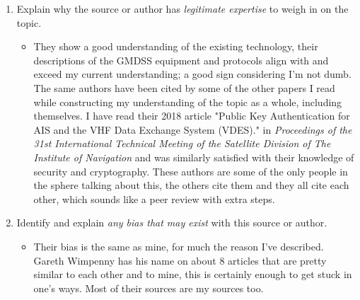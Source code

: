 \documentclass[12pt]{texMemo} %
\begin{document}
\begin{enumerate}
\begin{enumerate}
\begin{itemize}
        \end{itemize}
    \item Explain why the source or author has \emph{legitimate expertise} to weigh in on the topic.
        \begin{itemize}
            \item They show a good understanding of the existing technology, their descriptions of the GMDSS equipment and protocols align with and exceed my current understanding; a good sign considering I'm not dumb. The same authors have been cited by some of the other papers I read while constructing my understanding of the topic as a whole, including themselves. I have read their 2018 article "Public Key Authentication for AIS and the VHF Data Exchange System (VDES)." in \textit{Proceedings of the 31st International Technical Meeting of the Satellite Division of The Institute of Navigation} and was similarly satisfied with their knowledge of security and cryptography. These authors are some of the only people in the sphere talking about this, the others cite them and they all cite each other, which sounds like a peer review with extra steps.
        \end{itemize}
    \item Identify and explain \emph{any bias that may exist} with this source or author.
        \begin{itemize}
            \item Their bias is the same as mine, for much the reason I've described. Gareth Wimpenny has his name on about 8 articles that are pretty similar to each other and to mine, this is certainly enough to get stuck in one's ways. Most of their sources are my sources too. 
        \end{itemize}
\end{enumerate}
\end{enumerate}
\end{document}
